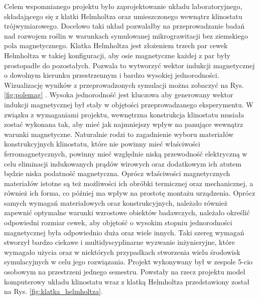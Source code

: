 Celem wspomnianego projektu było zaprojektowanie układu laboratoryjnego, składającego się z
 klatki Helmholtza oraz umieszczonego wewnątrz klinostatu trójwymiarowego. Docelowo taki układ
  pozwalałby na przeprowadzanie badań nad rozwojem roślin w warunkach symulowanej
   mikrograwitacji bez ziemskiego pola magnetycznego. Klatka Helmholtza jest złożeniem trzech
    par cewek Helmholtza \linebreak w takiej konfiguracji, aby osie magnetyczne każdej z par były
     prostopadłe do pozostałych. Pozwala to wytworzyć wektor indukcji magnetycznej o dowolnym
      kierunku przestrzennym i bardzo wysokiej jednorodności. Wizualizację wyników \linebreak z przeprowadzonych symulacji można zobaczyć na Rys. \ref{fig:polemag} . Wysoka jednorodność jest kluczowa
       aby generowany wektor indukcji magnetycznej był stały \linebreak w objętości przeprowadzanego
        eksperymentu. W związku z wymaganiami projektu, wewnętrzna konstrukcja klinostatu
         musiała zostać wykonana tak, aby mieć jak najmniejszy wpływ na panujące wewnątrz
          warunki magnetyczne. Naturalnie rodzi to zagadnienie wyboru materiałów konstrukcyjnych
           klinostatu, które nie powinny mieć właściwości ferromagnetycznych, powinny mieć
            względnie niską przewodność elektryczną w celu eliminacji indukowanych prądów
             wirowych oraz dodatkowym ich atutem będzie niska podatność magnetyczna. Oprócz
              właściwości magnetycznych materiałów istotne są też możliwości ich obróbki
               termicznej oraz mechanicznej, a również ich forma, co później ma wpływ na
                prostotę montażu urządzenia. Oprócz samych wymagań materiałowych oraz
                 konstrukcyjnych, należało również zapewnić optymalne warunki wzrostowe obiektów
                  badawczych, należało określić odpowiedni rozmiar cewek, aby objętość o wysokim
                   stopniu jednorodności magnetycznej była odpowiednio duża oraz wiele innych.
                    Taki szereg wymagań stworzył bardzo ciekawe i multidyscyplinarne wyzwanie
                     inżynieryjne, które wymagało użycia oraz w niektórych przypadkach
                      stworzenia wielu środowisk symulacyjnych \linebreak w celu jego rozwiązania. Projekt
                       wykonywany był w zespole 5-cio osobowym \linebreak na przestrzeni jednego semestru.
                        Powstały na rzecz projektu model komputerowy układu klinostatu wraz z
                         klatką Helmholtza przedstawiony został na Rys.
                          \ref{fig:klatka_helmholtza}.
                          
